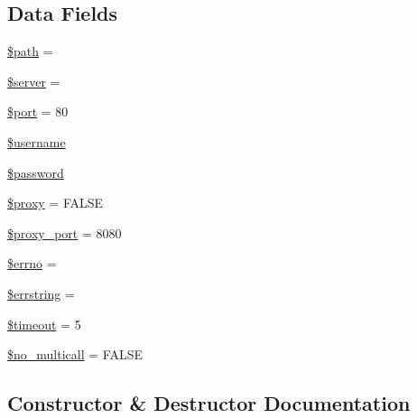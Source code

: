 \subsection*{Data Fields}
\begin{DoxyCompactItemize}
\item 
\hyperlink{class_x_m_l___r_p_c___client_a0a4baf0b22973c07685c3981f0d17fc4}{\$path} = \textquotesingle{}\textquotesingle{}
\item 
\hyperlink{class_x_m_l___r_p_c___client_ad135cc8a47e55f0829949cf62214170f}{\$server} = \textquotesingle{}\textquotesingle{}
\item 
\hyperlink{class_x_m_l___r_p_c___client_aa0787efab4b22e8a212882f3409d4c77}{\$port} = 80
\item 
\hyperlink{class_x_m_l___r_p_c___client_a0eb82aa5f81cf845de4b36cd653c42cf}{\$username}
\item 
\hyperlink{class_x_m_l___r_p_c___client_a607686ef9f99ea7c42f4f3dd3dbb2b0d}{\$password}
\item 
\hyperlink{class_x_m_l___r_p_c___client_a01564a63e754b8037a987f7f8fde0e6d}{\$proxy} = F\+A\+L\+S\+E
\item 
\hyperlink{class_x_m_l___r_p_c___client_a778054bf2337c6516bdad84294329511}{\$proxy\+\_\+port} = 8080
\item 
\hyperlink{class_x_m_l___r_p_c___client_a2be10a914e39a6b1f855ddf3b9a21367}{\$errno} = \textquotesingle{}\textquotesingle{}
\item 
\hyperlink{class_x_m_l___r_p_c___client_ac0e00fea1b952868a67648a9442a58da}{\$errstring} = \textquotesingle{}\textquotesingle{}
\item 
\hyperlink{class_x_m_l___r_p_c___client_a84320a9bf3e591d7ae20dfcb0dfe6a0d}{\$timeout} = 5
\item 
\hyperlink{class_x_m_l___r_p_c___client_a77b58d3e00e1054158dc707e34334497}{\$no\+\_\+multicall} = F\+A\+L\+S\+E
\end{DoxyCompactItemize}


\subsection{Constructor \& Destructor Documentation}
\hypertarget{class_x_m_l___r_p_c___client_ab665c9b62c100416c6c1e20ec650f553}{}
